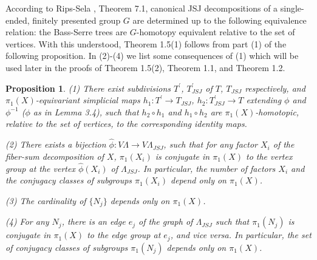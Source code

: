 \documentclass[11pt]{amsart}
\theoremstyle{plain}
\numberwithin{theorem}{section}
\newtheorem{proposition}[theorem]{Proposition}
\theoremstyle{definition}
\begin{document}
According to Rips-Sela \cite{RipS}, Theorem 7.1, canonical JSJ decompositions of a single-ended, 
finitely presented group $G$ are determined up to the following equivalence relation: the
Bass-Serre trees are $G$-homotopy equivalent relative to the set of vertices. With this 
understood, Theorem 1.5(1) follows from part (1) of the following proposition. In (2)-(4) we 
list some consequences of (1) which will be used later in the proofs of Theorem 1.5(2), 
Theorem 1.1, and Theorem 1.2. 

\begin{proposition}
(1) There exist subdivisions $T^\prime$, $T^\prime_{JSJ}$ of $T$, $T_{JSJ}$ respectively, and
$\pi_1(X)$-equivariant simplicial maps $h_1: T^\prime\rightarrow T_{JSJ}$, 
$h_2: T^\prime_{JSJ}\rightarrow T$ extending $\phi$ and $\phi^{-1}$ ($\phi$ as in Lemma 3.4),
such that $h_2\circ h_1$ and $h_1\circ h_2$ are $\pi_1(X)$-homotopic, relative to the set of vertices, 
to the corresponding identity maps. 

(2) There exists a bijection $\hat{\phi}: V\Lambda\rightarrow V\Lambda_{JSJ}$, such that for any
factor $X_i$ of the fiber-sum decomposition of $X$, $\pi_1(X_i)$ is conjugate 
in $\pi_1(X)$ to the vertex group at the vertex $\hat{\phi}(X_i)$ of $\Lambda_{JSJ}$. 
In particular, the number of factors $X_i$ and the conjugacy classes of subgroups 
$\pi_1(X_i)$ depend only on $\pi_1(X)$.

(3) The cardinality of $\{N_j\}$ depends only on $\pi_1(X)$. 

(4) For any $N_j$, there is an edge $e_j$ of the graph of $\Lambda_{JSJ}$ such that 
$\pi_1(N_j)$ is conjugate in $\pi_1(X)$ to the edge group at $e_j$, and vice versa. In 
particular, the set of conjugacy classes
of subgroups $\pi_1(N_j)$ depends only on $\pi_1(X)$. 
\end{proposition}
\end{document}
